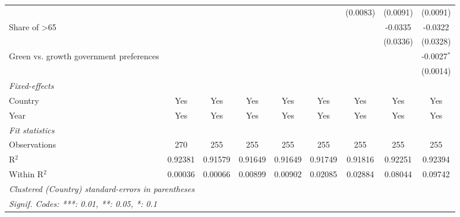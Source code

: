 \begin{table}[htbp]
\begin{tabular}{lcccccccc}
                                                                  &          &          &          &          &          & (0.0083) & (0.0091) & (0.0091)\\   
      Share of >65                                                &          &          &          &          &          &          & -0.0335  & -0.0322\\   
                                                                  &          &          &          &          &          &          & (0.0336) & (0.0328)\\   
      Green vs. growth government preferences                     &          &          &          &          &          &          &          & -0.0027$^{*}$\\   
                                                                  &          &          &          &          &          &          &          & (0.0014)\\   
      \midrule
      \emph{Fixed-effects}\\
      Country                                                     & Yes      & Yes      & Yes      & Yes      & Yes      & Yes      & Yes      & Yes\\  
      Year                                                        & Yes      & Yes      & Yes      & Yes      & Yes      & Yes      & Yes      & Yes\\  
      \midrule
      \emph{Fit statistics}\\
      Observations                                                & 270      & 255      & 255      & 255      & 255      & 255      & 255      & 255\\  
      R$^2$                                                       & 0.92381  & 0.91579  & 0.91649  & 0.91649  & 0.91749  & 0.91816  & 0.92251  & 0.92394\\  
      Within R$^2$                                                & 0.00036  & 0.00066  & 0.00899  & 0.00902  & 0.02085  & 0.02884  & 0.08044  & 0.09742\\  
      \midrule \midrule
      \multicolumn{9}{l}{\emph{Clustered (Country) standard-errors in parentheses}}\\
      \multicolumn{9}{l}{\emph{Signif. Codes: ***: 0.01, **: 0.05, *: 0.1}}\\
   \end{tabular}
\end{table}


